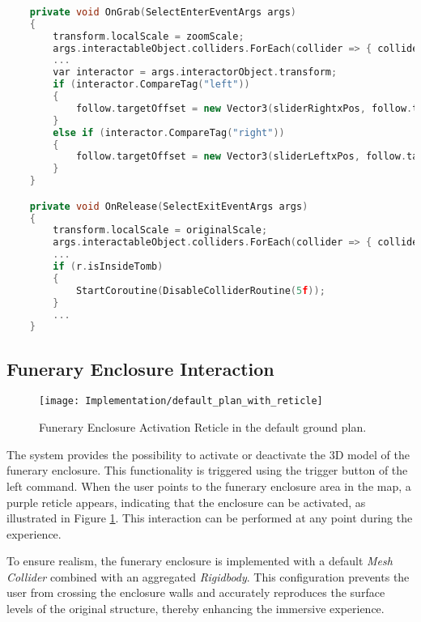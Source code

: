 \begin{lstlisting}[language=C++, caption={Partial Fragment of objects onGrab and onRelease events.}, label={lst:grab_release},float]
     
    private void OnGrab(SelectEnterEventArgs args)
    {
        transform.localScale = zoomScale;
        args.interactableObject.colliders.ForEach(collider => { collider.enabled = false; });
        ...
        var interactor = args.interactorObject.transform;
        if (interactor.CompareTag("left")) 
        {
            follow.targetOffset = new Vector3(sliderRightxPos, follow.targetOffset.y, follow.targetOffset.z);
        }
        else if (interactor.CompareTag("right")) 
        {
            follow.targetOffset = new Vector3(sliderLeftxPos, follow.targetOffset.y, follow.targetOffset.z);
        }
    }

    private void OnRelease(SelectExitEventArgs args)
    {
        transform.localScale = originalScale;
        args.interactableObject.colliders.ForEach(collider => { collider.enabled = true; });
        ...
        if (r.isInsideTomb)
        {
            StartCoroutine(DisableColliderRoutine(5f));
        }
        ...
    }
\end{lstlisting}


\subsection{Funerary Enclosure Interaction}
\label{sec:funerary_interaction}

 \begin{figure}[h!]
    \centering
    \texttt{[image: Implementation/default\_plan\_with\_reticle]}
    \caption{Funerary Enclosure Activation Reticle in the default ground plan.}
    \label{fig:funerary_interaction}    
\end{figure}

The system provides the possibility to activate or deactivate the \gls{3D} model of the funerary enclosure.
This functionality is triggered using the trigger button of the left command. When the user points to the funerary enclosure area in the map, a purple reticle appears, indicating that the enclosure can be activated, as illustrated in Figure \ref{fig:funerary_interaction}. This interaction can be performed at any point during the experience.

To ensure realism, the funerary enclosure is implemented with a default \emph{Mesh Collider} combined with an aggregated \emph{Rigidbody}. This configuration prevents the user from crossing the enclosure walls and accurately reproduces the surface levels of the original structure, thereby enhancing the immersive experience.

